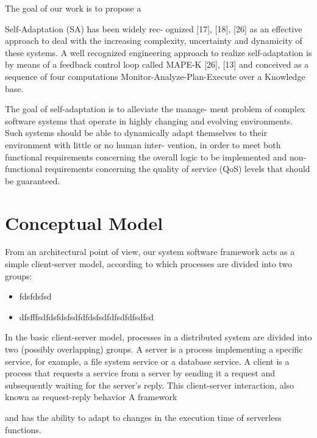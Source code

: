 \documentclass[12pt,a4paper]{report}
\begin{document}
The goal of our work is to propose a 



Self-Adaptation (SA) has been widely rec-
ognized [17], [18], [26] as an effective approach to deal
with the increasing complexity, uncertainty and dynamicity
of these systems. A well recognized engineering approach
to realize self-adaptation is by means of a feedback control
loop called MAPE-K [26], [13] and conceived as a sequence
of four computations Monitor-Analyze-Plan-Execute over a
Knowledge base.




The goal of self-adaptation is to alleviate the manage-
ment problem of complex software systems that operate
in highly changing and evolving environments. Such
systems should be able to dynamically adapt themselves
to their environment with little or no human inter-
vention, in order to meet both functional requirements
concerning the overall logic to be implemented and non-
functional requirements concerning the quality of service
(QoS) levels that should be guaranteed.

\chapter{Conceptual Model}

From an architectural point of view, our system software framework acts as a simple client-server model, according to which processes are divided into two groups:

\begin{itemize}
	
	\item fdsfdsfsd
	
	\item dfsfffsdfdsfdsfsdfdfdsfsdfdfsdfdfsdfsd
	
\end{itemize}


In the basic client-server model, processes in a distributed system are divided
into two (possibly overlapping) groups. A server is a process implementing
a specific service, for example, a file system service or a database service. A
client is a process that requests a service from a server by sending it a request
and subsequently waiting for the server’s reply. This client-server interaction,
also known as request-reply behavior 
A framework 




and has the ability to adapt
to changes in the execution time of serverless functions. 
\end{document}
